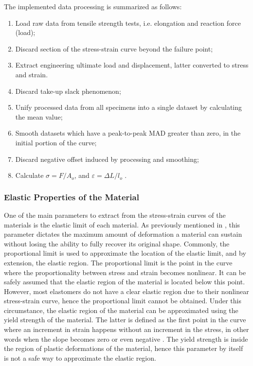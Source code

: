 The implemented data processing is summarized as follows:
 \begin{enumerate}[noitemsep] %
    \item Load raw data from tensile strength tests, i.e. elongation and reaction force (load);
    \item Discard section of the stress-strain curve beyond the failure point;
    \item Extract engineering ultimate load and displacement, latter converted to stress and strain.
    \item Discard take-up slack phenomenon;
    \item Unify processed data from all specimens into a single dataset by calculating the mean value;
    \item Smooth datasets which have a peak-to-peak MAD greater than zero, in the initial portion of the curve;
    \item Discard negative offset induced by processing and smoothing;
    \item Calculate $\sigma = F/A_o$, and $\varepsilon=\Delta L/l_o$ .
\end{enumerate}

\subsubsection{Elastic Properties of the Material} \label{sss:elasticProperties}

One of the main parameters to extract from the stress-strain curves of the materials is the elastic limit of each material. As previously mentioned in , this parameter dictates the maximum amount of deformation a material can sustain without losing the ability to fully recover its original shape. Commonly, the proportional limit is used to approximate the location of the elastic limit, and by extension, the elastic region. The proportional limit is the point in the curve where the proportionality between stress and strain becomes nonlinear. It can be safely assumed that the elastic region of the material is located below this point. However, most elastomers do not have a clear elastic region due to their nonlinear stress-strain curve, hence the proportional limit cannot be obtained. Under this circumstance, the elastic region of the material can be approximated using the yield strength of the material. The latter is defined as the first point in the curve where an increment in strain happens without an increment in the stress, in other words when the slope becomes zero or even negative \cite{astmd638}. The yield strength is inside the region of plastic deformations of the material, hence this parameter by itself is not a safe way to approximate the elastic region. 


